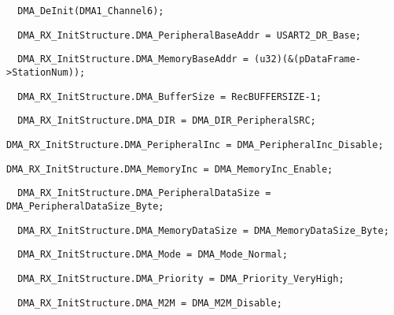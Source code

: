 \verb|	DMA_DeInit(DMA1_Channel6);|

\textit{}

\verb|	DMA_RX_InitStructure.DMA_PeripheralBaseAddr = USART2_DR_Base;|

\textit{\color{blue}{//配置DMA操作的存储器地址，知道这是一个地址就可以,u32表示该地址为32bit无符号数}}

\verb|	DMA_RX_InitStructure.DMA_MemoryBaseAddr = (u32)(&(pDataFrame->StationNum));|

\textit{\color{blue}{//每次DMA使能后传输的数据量,RecBUFFERSIZE是一个变量}}

\verb|	DMA_RX_InitStructure.DMA_BufferSize = RecBUFFERSIZE-1;	|

\textit{\color{blue}{//配置DMA的数据传输方向是从外设到存储器(外设为源头)}}

\verb|	DMA_RX_InitStructure.DMA_DIR = DMA_DIR_PeripheralSRC;|

\textit{\color{blue}{//外设地址在每个DMA原操作后不增加}}

	\verb|DMA_RX_InitStructure.DMA_PeripheralInc = DMA_PeripheralInc_Disable;|

\textit{\color{blue}{//外设地址在每个DMA原操作后增加}}

	\verb|DMA_RX_InitStructure.DMA_MemoryInc = DMA_MemoryInc_Enable;|

\textit{\color{blue}{//定义每次DMA原操作传输的数据为1字节,那么BufferSize * 1字节就是一次DMA操作传输的数据量}}

\verb|	DMA_RX_InitStructure.DMA_PeripheralDataSize = DMA_PeripheralDataSize_Byte;|

\textit{\color{blue}{//存储器地址递增的单位，也是一次DMA源操作接收的数据量大小}}

\verb|	DMA_RX_InitStructure.DMA_MemoryDataSize = DMA_MemoryDataSize_Byte;|

\textit{\color{blue}{//普通DMA模式，在本次DMA传输完成以后不再进入下一次DMA循环，BufferSize清零}}

\verb|	DMA_RX_InitStructure.DMA_Mode = DMA_Mode_Normal;|

\textit{\color{blue}{//当几个DMA请求同时被挂起时，当前DMA请求的优先级}}

\verb|	DMA_RX_InitStructure.DMA_Priority = DMA_Priority_VeryHigh;|

\textit{\color{blue}{//本DMA操作不是存储器到存储器的数据移动}}

\verb|	DMA_RX_InitStructure.DMA_M2M = DMA_M2M_Disable;|


